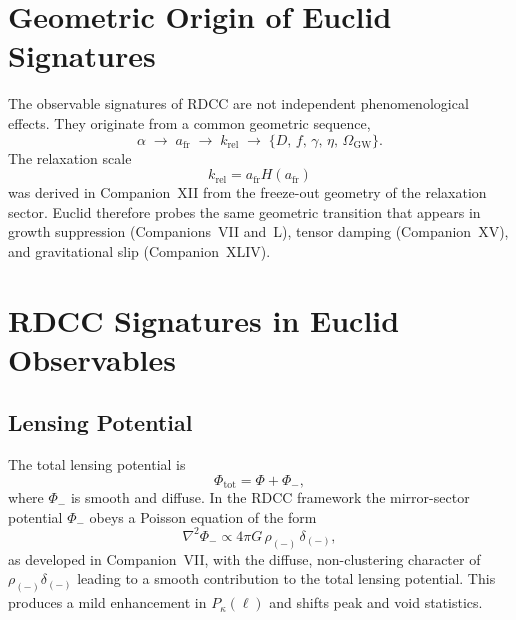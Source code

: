 \documentclass[11pt,a4paper]{article}
\begin{document}

\section{Geometric Origin of Euclid Signatures}

The observable signatures of RDCC are not independent phenomenological
effects. They originate from a common geometric sequence,
\begin{equation}
  \alpha
  \;\rightarrow\;
  a_{\mathrm{fr}}
  \;\rightarrow\;
  k_{\mathrm{rel}}
  \;\rightarrow\;
  \{D,\, f,\, \gamma,\, \eta,\, \Omega_{\mathrm{GW}}\}.
\end{equation}
The relaxation scale
\begin{equation}
  k_{\mathrm{rel}}
  =
  a_{\mathrm{fr}} H(a_{\mathrm{fr}})
\end{equation}
was derived in Companion~XII from the freeze-out geometry of the relaxation
sector. Euclid therefore probes the same geometric transition that appears in
growth suppression (Companions~VII and~L), tensor damping (Companion~XV), and
gravitational slip (Companion~XLIV).


\section{RDCC Signatures in Euclid Observables}

\subsection{Lensing Potential}

The total lensing potential is
\begin{equation}
  \Phi_{\mathrm{tot}}
  =
  \Phi + \Phi_{-},
\end{equation}
where \(\Phi_{-}\) is smooth and diffuse. In the RDCC framework the
mirror-sector potential \(\Phi_{-}\) obeys a Poisson equation of the form
\begin{equation}
  \nabla^{2} \Phi_{-}
  \propto
  4\pi G\, \rho_{(-)}\, \delta_{(-)},
\end{equation}
as developed in Companion~VII, with the diffuse, non-clustering character of
\(\rho_{(-)}\delta_{(-)}\) leading to a smooth contribution to the total
lensing potential. This produces a mild enhancement in \(P_{\kappa}(\ell)\)
and shifts peak and void statistics.
\end{document}
